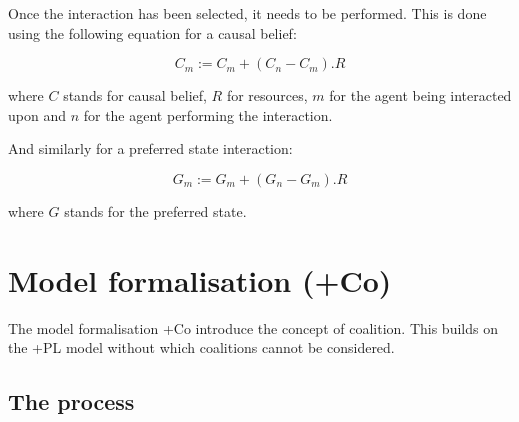 \documentclass[11pt]{article}
\begin{document}

Once the interaction has been selected, it needs to be performed. This is done using the following equation for a causal belief:

\begin{equation}
C_{m} := C_{m} + (C_{n} - C_{m}). R
\end{equation}

where $C$ stands for causal belief, $R$ for resources, $m$ for the agent being interacted upon and $n$ for the agent performing the interaction.

And similarly for a preferred state interaction:

\begin{equation}
G_{m} := G_{m} + (G_{n} - G_{m}). R
\end{equation}

where $G$ stands for the preferred state.




\section{Model formalisation (+Co)}

The model formalisation +Co introduce the concept of coalition. This builds on the +PL model without which coalitions cannot be considered.

\subsection{The process}
\end{document}
